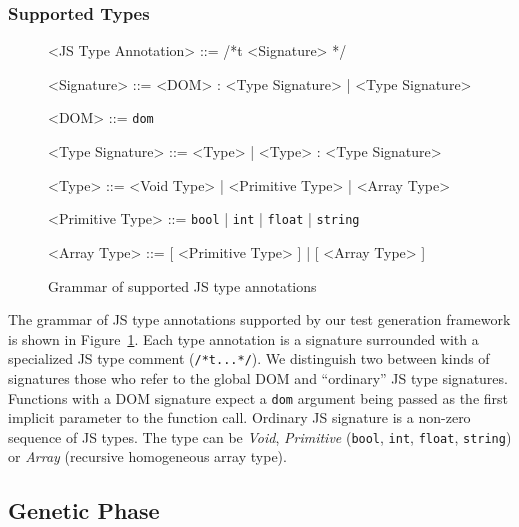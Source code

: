 \documentclass[sigconf]{acmart}
\begin{document}
\subsubsection{Supported Types}
\label{sub.sec.sup.types}

\begin{figure}[t]
\setlength{\grammarparsep}{3pt}
\small
\begin{grammar}

<JS Type Annotation> ::= /*t <Signature> */

<Signature> ::= <DOM> : <Type Signature> | <Type Signature>

<DOM> ::= \texttt{dom}

<Type Signature> ::= <Type> | <Type> : <Type Signature>

<Type> ::= <Void Type> | <Primitive Type> | <Array Type>

<Primitive Type> ::= \texttt{bool} | \texttt{int} | \texttt{float} | \texttt{string}

<Array Type> ::= [ <Primitive Type> ] | [ <Array Type> ]
\end{grammar}
\caption{Grammar of supported JS type annotations}
\label{fig.js.type.annot}
\end{figure}

The grammar of JS type annotations supported by our test generation framework is shown in Figure~\ref{fig.js.type.annot}. Each type annotation is a signature surrounded with a specialized JS type comment (\texttt{/*t...*/}). We distinguish two between kinds of signatures those who refer to the global DOM and ``ordinary'' JS type signatures. Functions with a DOM signature expect a \texttt{dom} argument being passed as the first implicit parameter to the function call. Ordinary JS signature is a non-zero sequence of JS types. The type can be \emph{Void}, \emph{Primitive} (\texttt{bool}, \texttt{int}, \texttt{float}, \texttt{string}) or \emph{Array} (recursive homogeneous array type).  


\subsection{Genetic Phase}
\label{sub.sec.genetic.phase}
\end{document}
